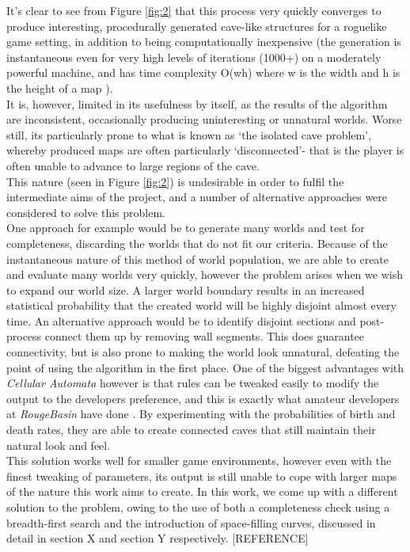 \documentclass[12pt,a4paper]{article}
\begin{document}
It's clear to see from Figure \ref{fig:2} that this process very quickly converges to produce interesting, procedurally generated cave-like structures for a roguelike game setting, in addition to being computationally inexpensive (the generation is instantaneous even for very high levels of iterations (1000+) on a moderately powerful machine, and has time complexity O(wh) where w is the width and h is the height of a map \cite{cellularcomplexity}). \\

It is, however, limited in its usefulness by itself, as the results of the algorithm are inconsistent, occasionally producing uninteresting or unnatural worlds. Worse still, its particularly prone to what is known as `the isolated cave problem', whereby produced maps are often particularly `disconnected'- that is the player is often unable to advance to large regions of the cave. \\

This nature (seen in Figure \ref{fig:2}) is undesirable in order to fulfil the intermediate aims of the project, and a number of alternative approaches were considered to solve this problem.\\

One approach for example would be to generate many worlds and test for completeness, discarding the worlds that do not fit our criteria. Because of the instantaneous nature of this method of world population, we are able to create and evaluate many worlds very quickly, however the problem arises when we wish to expand our world size. A larger world boundary results in an increased statistical probability that the created world will be highly disjoint almost every time. An alternative approach would be to identify disjoint sections and post-process connect them up by removing wall segments. This does guarantee connectivity, but is also prone to making the world look unnatural, defeating the point of using the algorithm in the first place. One of the biggest advantages with \emph{Cellular Automata} however is that rules can be tweaked easily to modify the output to the developers preference, and this is exactly what amateur developers at \emph{RougeBasin} have done \cite{roguebasin}. By experimenting with the probabilities of birth and death rates, they are able to create connected caves that still maintain their natural look and feel.\\

This solution works well for smaller game environments, however even with the finest tweaking of parameters, its output is still unable to cope with larger maps of the nature this work aims to create. In this work, we come up with a different solution to the problem, owing to the use of both a completeness check using a breadth-first search and the introduction of space-filling curves, discussed in detail in section X and section Y respectively.  [REFERENCE]
\end{document}

